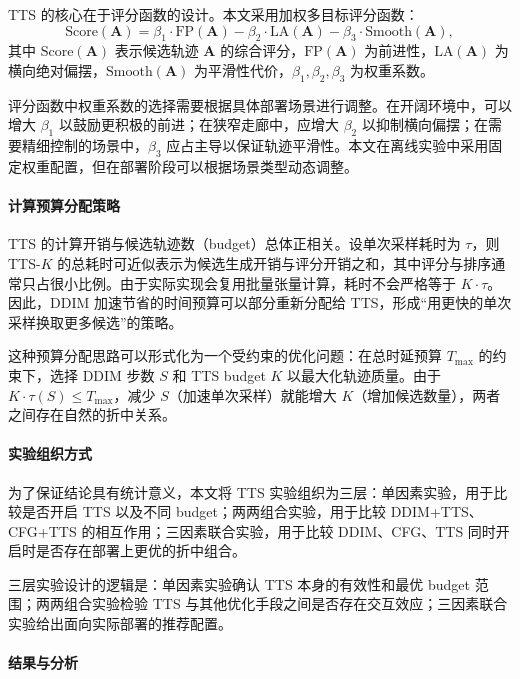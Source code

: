 TTS 的核心在于评分函数的设计。本文采用加权多目标评分函数：
\begin{equation}
\text{Score}(\mathbf{A}) = \beta_1 \cdot \text{FP}(\mathbf{A}) - \beta_2 \cdot \text{LA}(\mathbf{A}) - \beta_3 \cdot \text{Smooth}(\mathbf{A}),
\end{equation}
其中 $\text{Score}(\mathbf{A})$ 表示候选轨迹 $\mathbf{A}$ 的综合评分，$\text{FP}(\mathbf{A})$ 为前进性，$\text{LA}(\mathbf{A})$ 为横向绝对偏摆，$\text{Smooth}(\mathbf{A})$ 为平滑性代价，$\beta_1, \beta_2, \beta_3$ 为权重系数。

评分函数中权重系数的选择需要根据具体部署场景进行调整。在开阔环境中，可以增大 $\beta_1$ 以鼓励更积极的前进；在狭窄走廊中，应增大 $\beta_2$ 以抑制横向偏摆；在需要精细控制的场景中，$\beta_3$ 应占主导以保证轨迹平滑性。本文在离线实验中采用固定权重配置，但在部署阶段可以根据场景类型动态调整。

\paragraph*{计算预算分配策略}

TTS 的计算开销与候选轨迹数（budget）总体正相关。设单次采样耗时为 $\tau$，则 TTS-$K$ 的总耗时可近似表示为候选生成开销与评分开销之和，其中评分与排序通常只占很小比例。由于实际实现会复用批量张量计算，耗时不会严格等于 $K \cdot \tau$。因此，DDIM 加速节省的时间预算可以部分重新分配给 TTS，形成``用更快的单次采样换取更多候选''的策略。

这种预算分配思路可以形式化为一个受约束的优化问题：在总时延预算 $T_{\max}$ 的约束下，选择 DDIM 步数 $S$ 和 TTS budget $K$ 以最大化轨迹质量。由于 $K \cdot \tau(S) \leq T_{\max}$，减少 $S$（加速单次采样）就能增大 $K$（增加候选数量），两者之间存在自然的折中关系。

\paragraph*{实验组织方式}

为了保证结论具有统计意义，本文将 TTS 实验组织为三层：单因素实验，用于比较是否开启 TTS 以及不同 budget；两两组合实验，用于比较 DDIM+TTS、CFG+TTS 的相互作用；三因素联合实验，用于比较 DDIM、CFG、TTS 同时开启时是否存在部署上更优的折中组合。

三层实验设计的逻辑是：单因素实验确认 TTS 本身的有效性和最优 budget 范围；两两组合实验检验 TTS 与其他优化手段之间是否存在交互效应；三因素联合实验给出面向实际部署的推荐配置。

\paragraph*{结果与分析}

